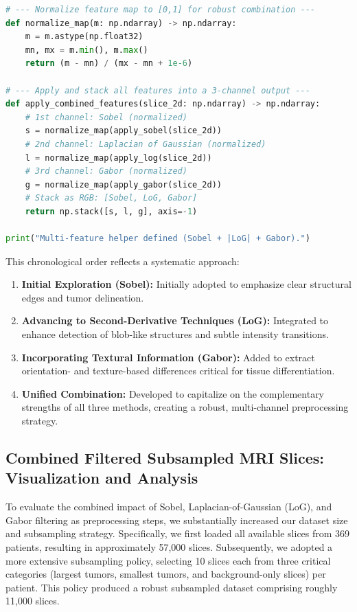 \begin{lstlisting}[language=Python]
# --- Normalize feature map to [0,1] for robust combination ---
def normalize_map(m: np.ndarray) -> np.ndarray:
    m = m.astype(np.float32)
    mn, mx = m.min(), m.max()
    return (m - mn) / (mx - mn + 1e-6)

# --- Apply and stack all features into a 3-channel output ---
def apply_combined_features(slice_2d: np.ndarray) -> np.ndarray:
    # 1st channel: Sobel (normalized)
    s = normalize_map(apply_sobel(slice_2d))
    # 2nd channel: Laplacian of Gaussian (normalized)
    l = normalize_map(apply_log(slice_2d))
    # 3rd channel: Gabor (normalized)
    g = normalize_map(apply_gabor(slice_2d))
    # Stack as RGB: [Sobel, LoG, Gabor]
    return np.stack([s, l, g], axis=-1)

print("Multi-feature helper defined (Sobel + |LoG| + Gabor).")

\end{lstlisting}

This chronological order reflects a systematic approach:

\begin{enumerate}
\item \textbf{Initial Exploration (Sobel):} Initially adopted to emphasize clear structural edges and tumor delineation.
\item \textbf{Advancing to Second-Derivative Techniques (LoG):} Integrated to enhance detection of blob-like structures and subtle intensity transitions.
\item \textbf{Incorporating Textural Information (Gabor):} Added to extract orientation- and texture-based differences critical for tissue differentiation.
\item \textbf{Unified Combination:} Developed to capitalize on the complementary strengths of all three methods, creating a robust, multi-channel preprocessing strategy.
\end{enumerate}

\subsection{Combined Filtered Subsampled MRI Slices: Visualization and Analysis}

To evaluate the combined impact of Sobel, Laplacian-of-Gaussian (LoG), and Gabor filtering as preprocessing steps, we substantially increased our dataset size and subsampling strategy. Specifically, we first loaded all available slices from 369 patients, resulting in approximately 57,000 slices. Subsequently, we adopted a more extensive subsampling policy, selecting 10 slices each from three critical categories (largest tumors, smallest tumors, and background-only slices) per patient. This policy produced a robust subsampled dataset comprising roughly 11,000 slices.

